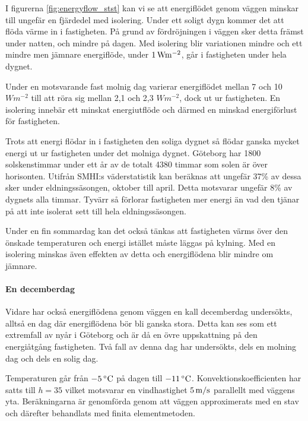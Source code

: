 I figurerna \ref{fig:energyflow_stst} kan vi se att energiflödet genom väggen minskar till 
ungefär en fjärdedel med isolering. Under ett soligt dygn kommer det att flöda värme in i
 fastigheten. På grund av fördröjningen i väggen sker detta främst under natten, 
 och mindre på dagen. Med isolering blir variationen mindre och ett mindre men jämnare 
 energiflöde, under $\unit[1]{W m^{-2}}$, går i fastigheten under hela dygnet.

Under en motsvarande fast molnig dag varierar energiflödet mellan 7 och 10 
$\unit{W m^{-2}}$ till att röra sig mellan 2,1 och 2,3 $\unit{W m^{-2}}$, dock ut ur 
fastigheten. En isolering innebär ett minskat energiutflöde och därmed en minskad 
energiförlust för fastigheten.

Trots att energi flödar in i fastigheten den soliga dygnet så flödar ganska mycket energi 
ut ur fastigheten under det molniga dygnet. Göteborg har 1800 solskenstimmar under ett
 år av de totalt 4380 timmar som solen är över horisonten. Utifrån SMHI:s väderstatistik \cite{SMHIdata}
 kan beräknas att ungefär 37\% av dessa sker under eldningssäsongen, oktober till april. 
 Detta motsvarar ungefär 8\% av dygnets alla timmar. Tyvärr så förlorar fastigheten mer 
 energi än vad den tjänar på att inte isolerat sett till hela eldningssäsongen.

Under en fin sommardag kan det också tänkas att fastigheten värms över den önskade 
temperaturen och energi istället måste läggas på kylning. Med en isolering minskas även 
effekten av detta och energiflödena blir mindre om jämnare.

\paragraph{En decemberdag}

Vidare har också energiflödena genom väggen en kall decemberdag undersökts, 
alltså en dag där energiflödena bör bli ganska stora. Detta kan ses som ett extremfall av
nyår i Göteborg och är då en övre uppskattning på den energiåtgång fastigheten. Två fall av
denna dag har undersökts, dels en molning dag och dels en solig dag.

 Temperaturen går från $\unit[-5]{^\circ C}$ på dagen till $\unit[-11]{^\circ C}$. 
 Konvektionskoefficienten har satts till $h=35$ 
 vilket motsvarar en vindhastighet $\unit[5]{m/s}$ parallellt med väggens yta. 
 Beräkningarna är genomförda genom att väggen approximerats med en stav och 
 därefter behandlats med finita elementmetoden.


